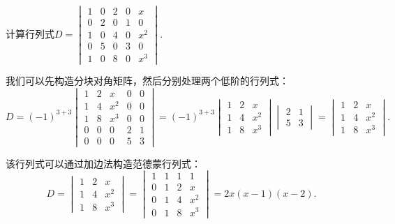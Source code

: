 \begin{exercise}
\begin{exgroup}
        \item 计算行列式$D=\begin{vmatrix}
                1 & 0 & 2 & 0 & x   \\
                0 & 2 & 0 & 1 & 0   \\
                1 & 0 & 4 & 0 & x^2 \\
                0 & 5 & 0 & 3 & 0   \\
                1 & 0 & 8 & 0 & x^3
            \end{vmatrix}$.
        \begin{answer}
            我们可以先构造分块对角矩阵，然后分别处理两个低阶的行列式：
            \[
                D = (-1)^{3+3} \begin{vmatrix}
                    1 & 2 & x   & 0 & 0 \\
                    1 & 4 & x^2 & 0 & 0 \\
                    1 & 8 & x^3 & 0 & 0 \\
                    0 & 0 & 0   & 2 & 1 \\
                    0 & 0 & 0   & 5 & 3
                \end{vmatrix} = (-1)^{3+3} \begin{vmatrix}
                    1 & 2 & x   \\
                    1 & 4 & x^2 \\
                    1 & 8 & x^3
                \end{vmatrix} \begin{vmatrix}
                    2 & 1 \\
                    5 & 3
                \end{vmatrix} = \begin{vmatrix}
                    1 & 2 & x   \\
                    1 & 4 & x^2 \\
                    1 & 8 & x^3
                \end{vmatrix}.
            \]

            该行列式可以通过加边法构造范德蒙行列式：
            \[
                D = \begin{vmatrix}
                    1 & 2 & x   \\
                    1 & 4 & x^2 \\
                    1 & 8 & x^3
                \end{vmatrix} = \begin{vmatrix}
                    1 & 1 & 1 & 1   \\
                    0 & 1 & 2 & x   \\
                    0 & 1 & 4 & x^2 \\
                    0 & 1 & 8 & x^3
                \end{vmatrix} = 2x(x-1)(x-2).
            \]
        \end{answer}


\end{exgroup}
\end{exercise}

